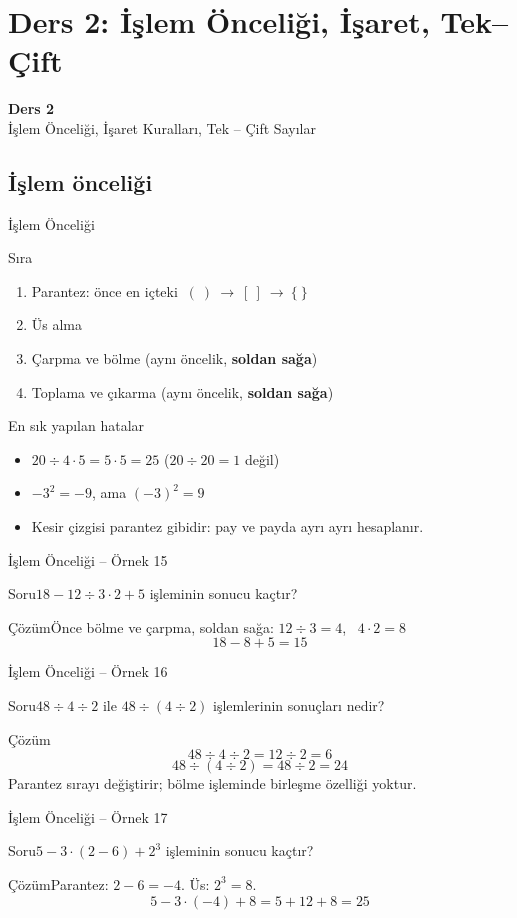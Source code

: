 \documentclass[aspectratio=169,11pt]{beamer}
\newcommand{\soru}[3]{%
\begin{frame}{#1}
  \begin{block}{Soru}\large #2\end{block}
  \pause
  \begin{exampleblock}{Çözüm}\large #3\end{exampleblock}
\end{frame}}
\begin{document}
\section{Ders 2: İşlem Önceliği, İşaret, Tek--Çift}
\begin{frame}
\centering\Large\color{anamavi}\textbf{Ders 2}\\[6pt]\normalsize İşlem Önceliği, İşaret Kuralları, Tek -- Çift Sayılar
\end{frame}

\subsection{İşlem önceliği}
\begin{frame}{İşlem Önceliği}
\begin{block}{Sıra}
\begin{enumerate}
\item Parantez: önce en içteki \(\ (\ )\ \rightarrow\ [\ ]\ \rightarrow\ \{\ \}\)
\item Üs alma
\item Çarpma ve bölme \quad (aynı öncelik, \textbf{soldan sağa})
\item Toplama ve çıkarma \quad (aynı öncelik, \textbf{soldan sağa})
\end{enumerate}
\end{block}
\begin{alertblock}{En sık yapılan hatalar}
\begin{itemize}
\item \(20\div 4\cdot 5=5\cdot 5=25\) \quad (\(20\div 20=1\) değil)
\item \(-3^2=-9\), \quad ama \quad \((-3)^2=9\)
\item Kesir çizgisi parantez gibidir: pay ve payda ayrı ayrı hesaplanır.
\end{itemize}
\end{alertblock}
\end{frame}

\soru{İşlem Önceliği -- Örnek 15}
{\(18-12\div 3\cdot 2+5\) işleminin sonucu kaçtır?}
{Önce bölme ve çarpma, soldan sağa: \(12\div 3=4\), \ \(4\cdot 2=8\)
\[18-8+5=15\]}

\soru{İşlem Önceliği -- Örnek 16}
{\(48\div 4\div 2\) ile \(48\div(4\div 2)\) işlemlerinin sonuçları nedir?}
{\[48\div 4\div 2=12\div 2=6\]
\[48\div(4\div 2)=48\div 2=24\]
Parantez sırayı değiştirir; bölme işleminde birleşme özelliği yoktur.}

\soru{İşlem Önceliği -- Örnek 17}
{\(5-3\cdot(2-6)+2^3\) işleminin sonucu kaçtır?}
{Parantez: \(2-6=-4\). \quad Üs: \(2^3=8\).
\[5-3\cdot(-4)+8=5+12+8=25\]}
\end{document}
